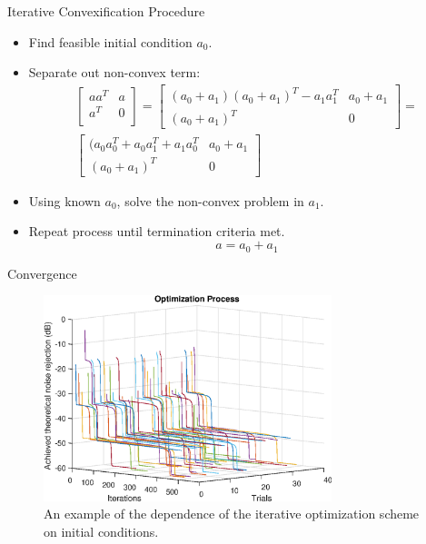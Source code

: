 \documentclass[10pt,usenames,dvipsnames]{beamer}
\begin{document}
\begin{frame}{Iterative Convexification Procedure}
	\begin{itemize}
		\item Find feasible initial condition $a_0$.
		\item Separate out non-convex term:
		\begin{multline*}
			\begin{bmatrix}
				aa^T & a \\
				a^T & 0 \\
			\end{bmatrix} = 
			\begin{bmatrix}
				(a_0 + a_1)(a_0 + a_1)^T - a_1a_1^T  & a_0 + a_1 \\
				(a_0 + a_1)^T & 0
			\end{bmatrix} = \\
			\begin{bmatrix}
				(a_0a_0^T + a_0a_1^T + a_1a_0^T & a_0 + a_1 \\
				(a_0 + a_1)^T & 0
			\end{bmatrix}		
		\end{multline*}
		\item Using known $a_0$, solve the non-convex problem in $a_1$.
		\item Repeat process until termination criteria met.
		\begin{equation*}
			a = a_0 + a_1
		\end{equation*}
	\end{itemize}
\end{frame}

\begin{frame}{Convergence}

\begin{figure}
	\centering
	\includegraphics[height=6cm]{opt-convergence}
	\caption{An example of the dependence of the iterative optimization scheme on initial conditions.}
\end{figure}

\end{frame}
\end{document}
